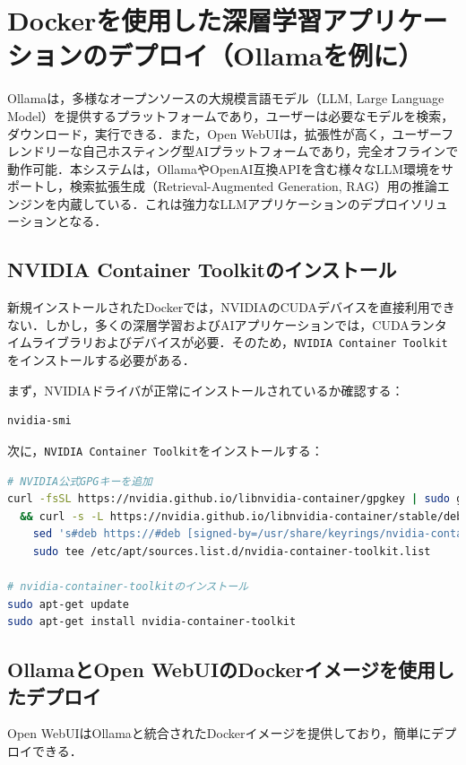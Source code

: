 \section{Dockerを使用した深層学習アプリケーションのデプロイ（Ollamaを例に）}
Ollamaは，多様なオープンソースの大規模言語モデル（LLM, Large Language Model）を提供するプラットフォームであり，ユーザーは必要なモデルを検索，ダウンロード，実行できる．また，Open WebUIは，拡張性が高く，ユーザーフレンドリーな自己ホスティング型AIプラットフォームであり，完全オフラインで動作可能．本システムは，OllamaやOpenAI互換APIを含む様々なLLM環境をサポートし，検索拡張生成（Retrieval-Augmented Generation, RAG）用の推論エンジンを内蔵している．これは強力なLLMアプリケーションのデプロイソリューションとなる．

\subsection{NVIDIA Container Toolkitのインストール}
新規インストールされたDockerでは，NVIDIAのCUDAデバイスを直接利用できない．しかし，多くの深層学習およびAIアプリケーションでは，CUDAランタイムライブラリおよびデバイスが必要．そのため，\texttt{NVIDIA Container Toolkit}をインストールする必要がある．

まず，NVIDIAドライバが正常にインストールされているか確認する：
\begin{lstlisting}[language=bash]
nvidia-smi
\end{lstlisting}

次に，\texttt{NVIDIA Container Toolkit}をインストールする：
\begin{lstlisting}[language=bash]
# NVIDIA公式GPGキーを追加
curl -fsSL https://nvidia.github.io/libnvidia-container/gpgkey | sudo gpg --dearmor -o /usr/share/keyrings/nvidia-container-toolkit-keyring.gpg \
  && curl -s -L https://nvidia.github.io/libnvidia-container/stable/deb/nvidia-container-toolkit.list | \
    sed 's#deb https://#deb [signed-by=/usr/share/keyrings/nvidia-container-toolkit-keyring.gpg] https://#g' | \
    sudo tee /etc/apt/sources.list.d/nvidia-container-toolkit.list

# nvidia-container-toolkitのインストール
sudo apt-get update
sudo apt-get install nvidia-container-toolkit
\end{lstlisting}

\subsection{OllamaとOpen WebUIのDockerイメージを使用したデプロイ}
Open WebUIはOllamaと統合されたDockerイメージを提供しており，簡単にデプロイできる．

